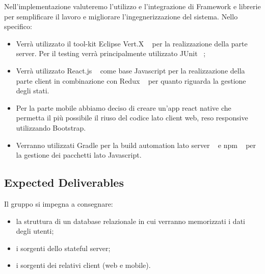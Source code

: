 \noindent Nell'implementazione valuteremo l'utilizzo e l'integrazione di Framework e librerie per semplificare il lavoro e migliorare l'ingegnerizzazione del sistema.\newline
Nello specifico:
\begin{itemize}
    \item Verrà utilizzato il tool-kit Eclipse Vert.X ~\cite{VertX:online} per la realizzazione della parte server. Per il testing verrà principalmente utilizzato JUnit ~\cite{JUnit576:online};
    \item Verrà utilizzato React.js ~\cite{React:online} come base Javascript per la realizzazione della parte client in combinazione con Redux ~\cite{redux:online} per quanto riguarda la gestione degli stati.
    \item Per la parte mobile abbiamo deciso di creare un'app react native che permetta il più possibile il riuso del codice lato client web, reso responsive utilizzando Bootstrap.
    \item Verranno utilizzati Gradle per la build automation lato server  ~\cite{GradleEnterprise:online} e npm ~\cite{npm:online} per la gestione dei pacchetti lato Javascript.
\end{itemize}
\subsection{Expected Deliverables}
Il gruppo si impegna a consegnare:
\begin{itemize}
    \item la struttura di un database relazionale in cui verranno memorizzati i dati degli utenti;
    \item i sorgenti dello stateful server;
    \item i sorgenti dei relativi client (web e mobile).
\end{itemize}
